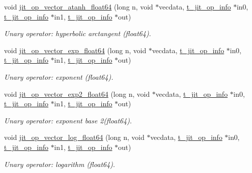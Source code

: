 \begin{DoxyCompactItemize}
void \hyperlink{group__opvecmod_ga5a6cef334e4a169eb9dc02191406230c}{jit\_\-op\_\-vector\_\-atanh\_\-float64} (long n, void $\ast$vecdata, \hyperlink{structt__jit__op__info}{t\_\-jit\_\-op\_\-info} $\ast$in0, \hyperlink{structt__jit__op__info}{t\_\-jit\_\-op\_\-info} $\ast$in1, \hyperlink{structt__jit__op__info}{t\_\-jit\_\-op\_\-info} $\ast$out)
\begin{DoxyCompactList}\small\item\em Unary operator: hyperbolic arctangent (float64). \item\end{DoxyCompactList}\item 
void \hyperlink{group__opvecmod_gabc5acddc043079dbc7cb1cce21aba954}{jit\_\-op\_\-vector\_\-exp\_\-float64} (long n, void $\ast$vecdata, \hyperlink{structt__jit__op__info}{t\_\-jit\_\-op\_\-info} $\ast$in0, \hyperlink{structt__jit__op__info}{t\_\-jit\_\-op\_\-info} $\ast$in1, \hyperlink{structt__jit__op__info}{t\_\-jit\_\-op\_\-info} $\ast$out)
\begin{DoxyCompactList}\small\item\em Unary operator: exponent (float64). \item\end{DoxyCompactList}\item 
void \hyperlink{group__opvecmod_gadd40619cdc366c6599bb6e145a8c59b6}{jit\_\-op\_\-vector\_\-exp2\_\-float64} (long n, void $\ast$vecdata, \hyperlink{structt__jit__op__info}{t\_\-jit\_\-op\_\-info} $\ast$in0, \hyperlink{structt__jit__op__info}{t\_\-jit\_\-op\_\-info} $\ast$in1, \hyperlink{structt__jit__op__info}{t\_\-jit\_\-op\_\-info} $\ast$out)
\begin{DoxyCompactList}\small\item\em Unary operator: exponent base 2(float64). \item\end{DoxyCompactList}\item 
void \hyperlink{group__opvecmod_ga9d662157694e9cf219851e07c5d95955}{jit\_\-op\_\-vector\_\-log\_\-float64} (long n, void $\ast$vecdata, \hyperlink{structt__jit__op__info}{t\_\-jit\_\-op\_\-info} $\ast$in0, \hyperlink{structt__jit__op__info}{t\_\-jit\_\-op\_\-info} $\ast$in1, \hyperlink{structt__jit__op__info}{t\_\-jit\_\-op\_\-info} $\ast$out)
\begin{DoxyCompactList}\small\item\em Unary operator: logarithm (float64). \item\end{DoxyCompactList}\item 

\end{DoxyCompactItemize}
